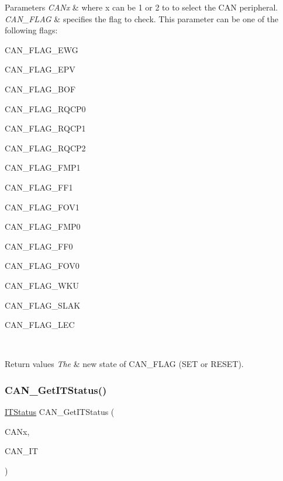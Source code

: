 \begin{DoxyParams}{Parameters}
{\em C\+A\+Nx} & where x can be 1 or 2 to to select the C\+AN peripheral. \\
\hline
{\em C\+A\+N\+\_\+\+F\+L\+AG} & specifies the flag to check. This parameter can be one of the following flags\+:
\begin{DoxyItemize}
\item C\+A\+N\+\_\+\+F\+L\+A\+G\+\_\+\+E\+WG
\item C\+A\+N\+\_\+\+F\+L\+A\+G\+\_\+\+E\+PV
\item C\+A\+N\+\_\+\+F\+L\+A\+G\+\_\+\+B\+OF
\item C\+A\+N\+\_\+\+F\+L\+A\+G\+\_\+\+R\+Q\+C\+P0
\item C\+A\+N\+\_\+\+F\+L\+A\+G\+\_\+\+R\+Q\+C\+P1
\item C\+A\+N\+\_\+\+F\+L\+A\+G\+\_\+\+R\+Q\+C\+P2
\item C\+A\+N\+\_\+\+F\+L\+A\+G\+\_\+\+F\+M\+P1
\item C\+A\+N\+\_\+\+F\+L\+A\+G\+\_\+\+F\+F1
\item C\+A\+N\+\_\+\+F\+L\+A\+G\+\_\+\+F\+O\+V1
\item C\+A\+N\+\_\+\+F\+L\+A\+G\+\_\+\+F\+M\+P0
\item C\+A\+N\+\_\+\+F\+L\+A\+G\+\_\+\+F\+F0
\item C\+A\+N\+\_\+\+F\+L\+A\+G\+\_\+\+F\+O\+V0
\item C\+A\+N\+\_\+\+F\+L\+A\+G\+\_\+\+W\+KU
\item C\+A\+N\+\_\+\+F\+L\+A\+G\+\_\+\+S\+L\+AK
\item C\+A\+N\+\_\+\+F\+L\+A\+G\+\_\+\+L\+EC
\end{DoxyItemize}\\
\hline
\end{DoxyParams}

\begin{DoxyRetVals}{Return values}
{\em The} & new state of C\+A\+N\+\_\+\+F\+L\+AG (S\+ET or R\+E\+S\+ET). \\
\hline
\end{DoxyRetVals}
\mbox{\label{group___c_a_n___exported___functions_ga9aca05b3013e1b3438f3559f80b33c82}} 
\subsubsection{\texorpdfstring{CAN\_GetITStatus()}{CAN\_GetITStatus()}}
{\footnotesize\ttfamily \mbox{\hyperlink{group___exported__types_gaacbd7ed539db0aacd973a0f6eca34074}{I\+T\+Status}} C\+A\+N\+\_\+\+Get\+I\+T\+Status (\begin{DoxyParamCaption}\item[{\mbox{\hyperlink{struct_c_a_n___type_def}{C\+A\+N\+\_\+\+Type\+Def}} $\ast$}]{C\+A\+Nx,  }\item[{uint32\+\_\+t}]{C\+A\+N\+\_\+\+IT }\end{DoxyParamCaption})}



